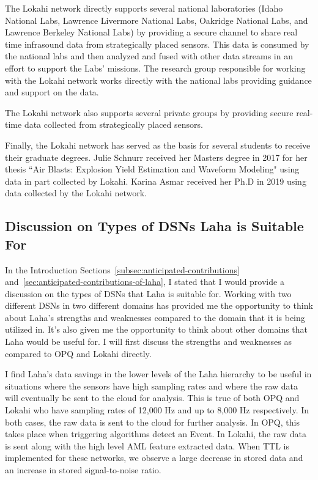 The Lokahi network directly supports several national laboratories (Idaho National Labs, Lawrence Livermore National Labs, Oakridge National Labs, and Lawrence Berkeley National Labs) by providing a secure channel to share real time infrasound data from strategically placed sensors. This data is consumed by the national labs and then analyzed and fused with other data streams in an effort to support the Labs' missions. The research group responsible for working with the Lokahi network works directly with the national labs providing guidance and support on the data.

The Lokahi network also supports several private groups by providing secure real-time data collected from strategically placed sensors.

Finally, the Lokahi network has served as the basis for several students to receive their graduate degrees. Julie Schnurr received her Masters degree in 2017 for her thesis ``Air Blasts: Explosion Yield Estimation and Waveform Modeling"\cite{julie} using data in part collected by Lokahi. Karina Asmar received her Ph.D\cite{asmar19} in 2019 using data collected by the Lokahi network.

\subsection{Discussion on Types of DSNs Laha is Suitable For}\label{subsec:discussion-on-types-of-dsns-laha-is-suitable-for}

In the Introduction Sections~\ref{subsec:anticipated-contributions} and~\ref{sec:anticipated-contributions-of-laha}, I stated that I would provide a discussion on the types of DSNs that Laha is suitable for. Working with two different DSNs in two different domains has provided me the opportunity to think about Laha's strengths and weaknesses compared to the domain that it is being utilized in. It's also given me the opportunity to think about other domains that Laha would be useful for. I will first discuss the strengths and weaknesses as compared to OPQ and Lokahi directly.

I find Laha's data savings in the lower levels of the Laha hierarchy to be useful in situations where the sensors have high sampling rates and where the raw data will eventually be sent to the cloud for analysis. This is true of both OPQ and Lokahi who have sampling rates of 12,000 Hz and up to 8,000 Hz respectively. In both cases, the raw data is sent to the cloud for further analysis. In OPQ, this takes place when triggering algorithms detect an Event. In Lokahi, the raw data is sent along with the high level AML feature extracted data. When TTL is implemented for these networks, we observe a large decrease in stored data and an increase in stored signal-to-noise ratio.


